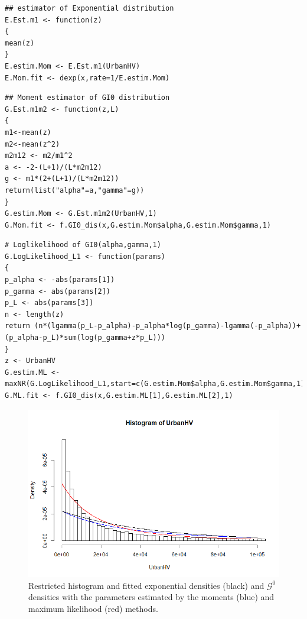\documentclass[conference,onecolumn]{IEEEtran}
\begin{document}
\begin{lstlisting}[caption={The estimator of Exponential distribution},label={code:exp_estim}]
## estimator of Exponential distribution
E.Est.m1 <- function(z)
{
mean(z)
}
E.estim.Mom <- E.Est.m1(UrbanHV)
E.Mom.fit <- dexp(x,rate=1/E.estim.Mom)
\end{lstlisting}

\begin{lstlisting}[caption={The moment estimator of $\mathcal{G}^0$ distribution},label={code:G_mom_estim}]
## Moment estimator of GI0 distribution
G.Est.m1m2 <- function(z,L)
{
m1<-mean(z)
m2<-mean(z^2)
m2m12 <- m2/m1^2
a <- -2-(L+1)/(L*m2m12)
g <- m1*(2+(L+1)/(L*m2m12))
return(list("alpha"=a,"gamma"=g))
}
G.estim.Mom <- G.Est.m1m2(UrbanHV,1)
G.Mom.fit <- f.GI0_dis(x,G.estim.Mom$alpha,G.estim.Mom$gamma,1)
\end{lstlisting}

\begin{lstlisting}[caption={The ML estimator of $\mathcal{G}^0$ distribution},label={code:G_ML_estim}]
# Loglikelihood of GI0(alpha,gamma,1)
G.LogLikelihood_L1 <- function(params)
{
p_alpha <- -abs(params[1])
p_gamma <- abs(params[2])
p_L <- abs(params[3])
n <- length(z)
return (n*(lgamma(p_L-p_alpha)-p_alpha*log(p_gamma)-lgamma(-p_alpha))+(p_alpha-p_L)*sum(log(p_gamma+z*p_L)))
}
z <- UrbanHV
G.estim.ML <- maxNR(G.LogLikelihood_L1,start=c(G.estim.Mom$alpha,G.estim.Mom$gamma,1),activePar=c(TRUE,TRUE,FALSE))$estimate[1:2]
G.ML.fit <- f.GI0_dis(x,G.estim.ML[1],G.estim.ML[2],1)
\end{lstlisting}

\begin{figure}[htbp]
	\centering
	\includegraphics[width=.9\linewidth]{Fit_UrbanHV.png}
	\caption{Restricted histogram and fitted exponential densities (black) and $\mathcal{G}^0$ densities with the parameters estimated by the moments (blue) and maximum likelihood (red) methods.}
	\label{Fig:Fit_UrbanHV}
\end{figure}
\end{document}
